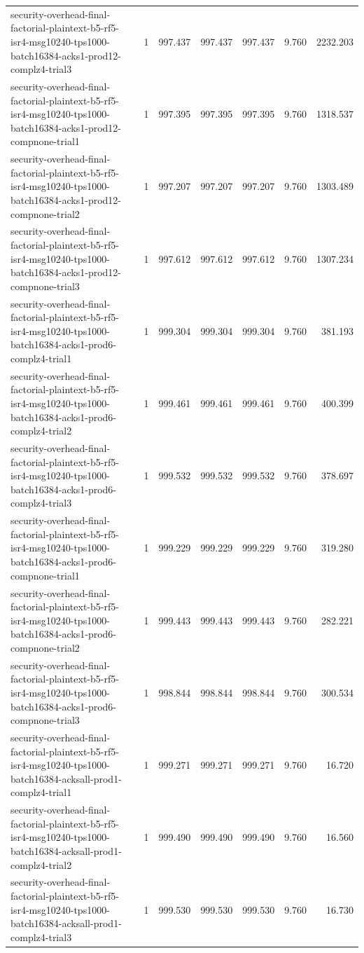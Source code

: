 \begin{tabular}{lrrrrrr}
security-overhead-final-factorial-plaintext-b5-rf5-isr4-msg10240-tps1000-batch16384-acks1-prod12-complz4-trial3 & 1 & 997.437 & 997.437 & 997.437 & 9.760 & 2232.203 \\
security-overhead-final-factorial-plaintext-b5-rf5-isr4-msg10240-tps1000-batch16384-acks1-prod12-compnone-trial1 & 1 & 997.395 & 997.395 & 997.395 & 9.760 & 1318.537 \\
security-overhead-final-factorial-plaintext-b5-rf5-isr4-msg10240-tps1000-batch16384-acks1-prod12-compnone-trial2 & 1 & 997.207 & 997.207 & 997.207 & 9.760 & 1303.489 \\
security-overhead-final-factorial-plaintext-b5-rf5-isr4-msg10240-tps1000-batch16384-acks1-prod12-compnone-trial3 & 1 & 997.612 & 997.612 & 997.612 & 9.760 & 1307.234 \\
security-overhead-final-factorial-plaintext-b5-rf5-isr4-msg10240-tps1000-batch16384-acks1-prod6-complz4-trial1 & 1 & 999.304 & 999.304 & 999.304 & 9.760 & 381.193 \\
security-overhead-final-factorial-plaintext-b5-rf5-isr4-msg10240-tps1000-batch16384-acks1-prod6-complz4-trial2 & 1 & 999.461 & 999.461 & 999.461 & 9.760 & 400.399 \\
security-overhead-final-factorial-plaintext-b5-rf5-isr4-msg10240-tps1000-batch16384-acks1-prod6-complz4-trial3 & 1 & 999.532 & 999.532 & 999.532 & 9.760 & 378.697 \\
security-overhead-final-factorial-plaintext-b5-rf5-isr4-msg10240-tps1000-batch16384-acks1-prod6-compnone-trial1 & 1 & 999.229 & 999.229 & 999.229 & 9.760 & 319.280 \\
security-overhead-final-factorial-plaintext-b5-rf5-isr4-msg10240-tps1000-batch16384-acks1-prod6-compnone-trial2 & 1 & 999.443 & 999.443 & 999.443 & 9.760 & 282.221 \\
security-overhead-final-factorial-plaintext-b5-rf5-isr4-msg10240-tps1000-batch16384-acks1-prod6-compnone-trial3 & 1 & 998.844 & 998.844 & 998.844 & 9.760 & 300.534 \\
security-overhead-final-factorial-plaintext-b5-rf5-isr4-msg10240-tps1000-batch16384-acksall-prod1-complz4-trial1 & 1 & 999.271 & 999.271 & 999.271 & 9.760 & 16.720 \\
security-overhead-final-factorial-plaintext-b5-rf5-isr4-msg10240-tps1000-batch16384-acksall-prod1-complz4-trial2 & 1 & 999.490 & 999.490 & 999.490 & 9.760 & 16.560 \\
security-overhead-final-factorial-plaintext-b5-rf5-isr4-msg10240-tps1000-batch16384-acksall-prod1-complz4-trial3 & 1 & 999.530 & 999.530 & 999.530 & 9.760 & 16.730 \\

\end{tabular}
